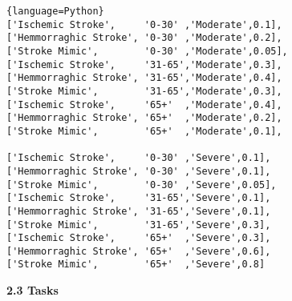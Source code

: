 \documentclass[a4paper, 11pt]{article}
\begin{document}
\begin{lstlisting}{language=Python}
['Ischemic Stroke',     '0-30' ,'Moderate',0.1],
['Hemmorraghic Stroke', '0-30' ,'Moderate',0.2],
['Stroke Mimic',        '0-30' ,'Moderate',0.05],
['Ischemic Stroke',     '31-65','Moderate',0.3],
['Hemmorraghic Stroke', '31-65','Moderate',0.4],
['Stroke Mimic',        '31-65','Moderate',0.3],
['Ischemic Stroke',     '65+'  ,'Moderate',0.4],
['Hemmorraghic Stroke', '65+'  ,'Moderate',0.2],
['Stroke Mimic',        '65+'  ,'Moderate',0.1],

['Ischemic Stroke',     '0-30' ,'Severe',0.1],
['Hemmorraghic Stroke', '0-30' ,'Severe',0.1],
['Stroke Mimic',        '0-30' ,'Severe',0.05],
['Ischemic Stroke',     '31-65','Severe',0.1],
['Hemmorraghic Stroke', '31-65','Severe',0.1],
['Stroke Mimic',        '31-65','Severe',0.3],
['Ischemic Stroke',     '65+'  ,'Severe',0.3],
['Hemmorraghic Stroke', '65+'  ,'Severe',0.6],
['Stroke Mimic',        '65+'  ,'Severe',0.8]
\end{lstlisting}

\textbf{2.3 Tasks}
\end{document}
